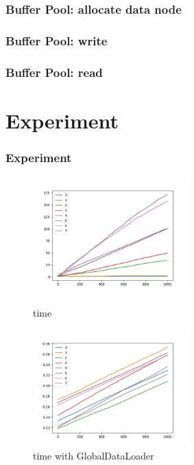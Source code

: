 \documentclass[notheorems, aspectratio=54]{beamer}
\begin{document}
\begin{frame}
    \frametitle{Buffer Pool: allocate data node}
\end{frame}

\begin{frame}
    \frametitle{Buffer Pool: write}
\end{frame}

\begin{frame}
    \frametitle{Buffer Pool: read}
\end{frame}
\section{Experiment}

\begin{frame}
    \frametitle{Experiment}
    \begin{figure}[htbp]
        \centering
        \begin{minipage}[t]{0.48\textwidth}
        \centering
        \includegraphics[width=6cm]{global_img_dir/l.jpg}
        \caption{time}
        \end{minipage}
        \begin{minipage}[t]{0.48\textwidth}
        \centering
        \includegraphics[width=6cm]{global_img_dir/gl.jpg}
        \caption{time with GlobalDataLoader}
        \end{minipage}
    \end{figure}
\end{frame}
\end{document}
